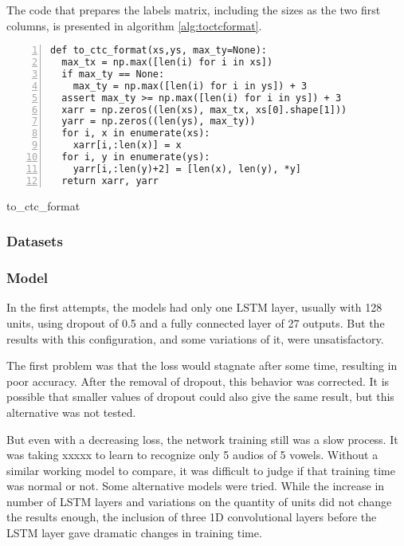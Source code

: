 The code that prepares the labels matrix, including the sizes as the two first columns, is presented in algorithm \ref{alg:toctcformat}.

\noindent
\begin{algorithm}

\begin{lstlisting}[frame=single, numbers=left]
def to_ctc_format(xs,ys, max_ty=None):
  max_tx = np.max([len(i) for i in xs])
  if max_ty == None:
    max_ty = np.max([len(i) for i in ys]) + 3
  assert max_ty >= np.max([len(i) for i in ys]) + 3
  xarr = np.zeros((len(xs), max_tx, xs[0].shape[1]))
  yarr = np.zeros((len(ys), max_ty))
  for i, x in enumerate(xs):
    xarr[i,:len(x)] = x
  for i, y in enumerate(ys):
    yarr[i,:len(y)+2] = [len(x), len(y), *y]
  return xarr, yarr
\end{lstlisting}
\caption{\label{alg:toctcformat}to\_ctc\_format}
\end{algorithm}

\subsubsection{Datasets}


\subsubsection{Model}

In the first attempts, the models had only one LSTM layer, usually with 128 units, using dropout of 0.5 and a fully connected layer of 27 outputs. But the results with this configuration, and some variations of it, were unsatisfactory.

The first problem was that the loss would stagnate after some time, resulting in poor accuracy. After the removal of dropout, this behavior was corrected. It is possible that smaller values of dropout could also give the same result, but this alternative was not tested.

But even with a decreasing loss, the network training still was a slow process. It was taking xxxxx  to learn to recognize only 5 audios of 5 vowels.
Without a similar working model to compare, it was difficult to judge if that training time was normal or not. Some alternative models were tried. While the increase in number of LSTM layers and variations on the quantity of units did not change the results enough, the inclusion of three 1D convolutional layers before the LSTM layer gave dramatic changes in training time.

